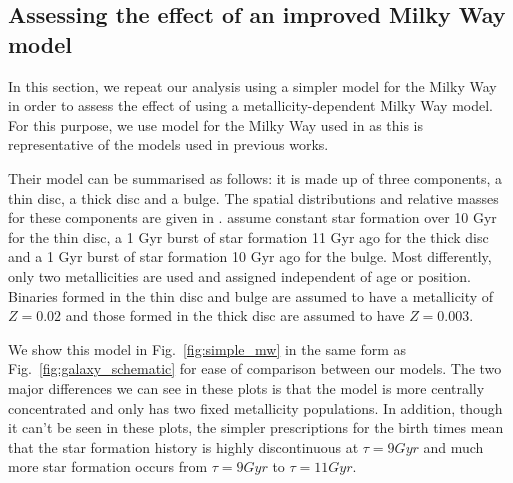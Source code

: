\subsection{Assessing the effect of an improved Milky Way model}
In this section, we repeat our analysis using a simpler model for the Milky Way in order to assess the effect of using a metallicity-dependent Milky Way model. For this purpose, we use model for the Milky Way used in \citet{Breivik+2020} as this is representative of the models used in previous works.

Their model can be summarised as follows: it is made up of three components, a thin disc, a thick disc and a bulge. The spatial distributions and relative masses for these components are given in \citet{McMillan+2011}. \citet{Breivik+2020} assume constant star formation over 10 Gyr for the thin disc, a 1 Gyr burst of star formation 11 Gyr ago for the thick disc and a 1 Gyr burst of star formation 10 Gyr ago for the bulge. Most differently, only two metallicities are used and assigned independent of age or position. Binaries formed in the thin disc and bulge are assumed to have a metallicity of $Z = 0.02$ and those formed in the thick disc are assumed to have $Z = 0.003$.

We show this model in Fig.~\ref{fig:simple_mw} in the same form as Fig.~\ref{fig:galaxy_schematic} for ease of comparison between our models. The two major differences we can see in these plots is that the \citet{Breivik+2020} model is more centrally concentrated and only has two fixed metallicity populations. In addition, though it can't be seen in these plots, the simpler prescriptions for the birth times mean that the star formation history is highly discontinuous at $\tau = 9 \unit{Gyr}$ and much more star formation occurs from $\tau = 9 \unit{Gyr}$ to $\tau = 11 \unit{Gyr}$.

